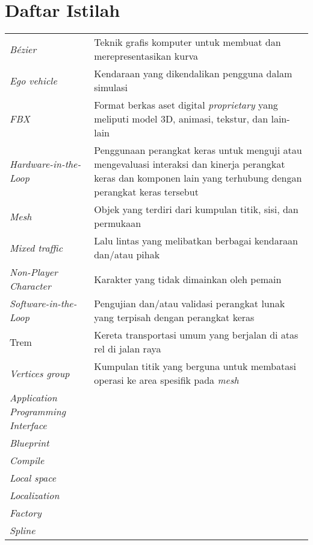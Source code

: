 \chapter*{Daftar Istilah}

\begingroup
\def\arraystretch{1.25}
\begin{onehalfspace}
\begin{longtable}{p{} p{}}
	\textit{Bézier} & Teknik grafis komputer untuk membuat dan merepresentasikan kurva \\
	\textit{Ego vehicle} & Kendaraan yang dikendalikan pengguna dalam simulasi \\
	\textit{FBX} & Format berkas aset digital \textit{proprietary} yang meliputi model 3D, animasi, tekstur, dan lain-lain \\
	\textit{Hardware-in-the-Loop} & Penggunaan perangkat keras untuk menguji atau mengevaluasi interaksi dan kinerja perangkat keras dan komponen lain yang terhubung dengan perangkat keras tersebut \\
	\textit{Mesh} & Objek yang terdiri dari kumpulan titik, sisi, dan permukaan \\
	\textit{Mixed traffic} & Lalu lintas yang melibatkan berbagai kendaraan dan/atau pihak \\
	\textit{Non-Player Character} & Karakter yang tidak dimainkan oleh pemain \\
	\textit{Software-in-the-Loop} & Pengujian dan/atau validasi perangkat lunak yang terpisah dengan perangkat keras \\
	Trem & Kereta transportasi umum yang berjalan di atas rel di jalan raya \\
	\textit{Vertices group} & Kumpulan titik yang berguna untuk membatasi operasi ke area spesifik pada \textit{mesh} \\

	\textit{Application Programming Interface} & \\
	\textit{Blueprint} &  \\
	\textit{Compile} & \\
	\textit{Local space} & \\
	\textit{Localization} & \\
	\textit{Factory} &  \\
	\textit{Spline} &  \\



\end{longtable}
\end{onehalfspace}
